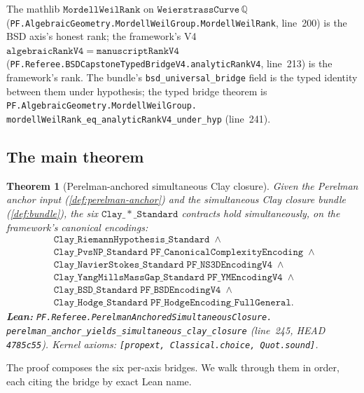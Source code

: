 \documentclass[11pt,a4paper]{article}
\theoremstyle{plain}
\newtheorem{theorem}{Theorem}[section]
\theoremstyle{definition}
\begin{document}
The mathlib $\mathtt{MordellWeilRank}$ on
$\mathtt{WeierstrassCurve}\, \mathbb{Q}$
(\texttt{PF.AlgebraicGeometry.MordellWeilGroup.MordellWeilRank},
line~200) is the BSD axis's honest rank; the framework's V4
$\mathtt{algebraicRankV4} = \mathtt{manuscriptRankV4}$
(\texttt{PF.Referee.BSDCapstoneTypedBridgeV4.analyticRankV4},
line~213) is the framework's rank. The bundle's
\texttt{bsd\_universal\_bridge} field is the typed identity between
them under hypothesis; the typed bridge theorem is
\texttt{PF.AlgebraicGeometry.MordellWeilGroup.\\
mordellWeilRank\_eq\_analyticRankV4\_under\_hyp}
(line~241).

\subsection{The main theorem}
\label{sec:main-theorem}

\begin{theorem}[Perelman-anchored simultaneous Clay closure]
\label{thm:main}
Given the Perelman anchor input (\cref{def:perelman-anchor}) and the
simultaneous Clay closure bundle (\cref{def:bundle}), the six
$\mathtt{Clay\_*\_Standard}$ contracts hold simultaneously, on the
framework's canonical encodings:
\begin{align*}
&\mathtt{Clay\_RiemannHypothesis\_Standard} \;\wedge\; \\
&\mathtt{Clay\_PvsNP\_Standard\;PF\_CanonicalComplexityEncoding}
\;\wedge\; \\
&\mathtt{Clay\_NavierStokes\_Standard\;PF\_NS3DEncodingV4}
\;\wedge\; \\
&\mathtt{Clay\_YangMillsMassGap\_Standard\;PF\_YMEncodingV4}
\;\wedge\; \\
&\mathtt{Clay\_BSD\_Standard\;PF\_BSDEncodingV4}
\;\wedge\; \\
&\mathtt{Clay\_Hodge\_Standard\;PF\_HodgeEncoding\_FullGeneral}.
\end{align*}
\textbf{Lean:}
\texttt{PF.Referee.PerelmanAnchoredSimultaneousClosure.\\
perelman\_anchor\_yields\_simultaneous\_clay\_closure}
(line~245, HEAD \texttt{4785c55}). Kernel axioms:
\texttt{[propext, Classical.choice, Quot.sound]}.
\end{theorem}

\noindent The proof composes the six per-axis bridges. We walk
through them in order, each citing the bridge by exact Lean name.
\end{document}
